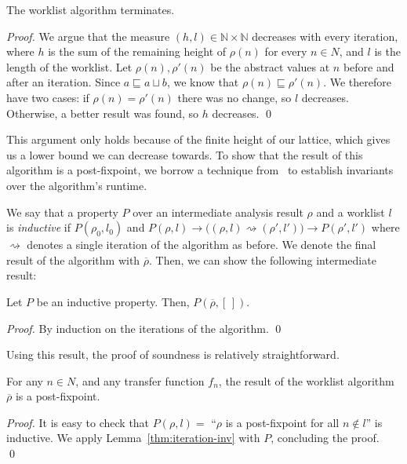 \documentclass[runningheads]{llncs}
\newcommand{\lub}{\sqcup}
\newcommand{\squb}{\sqsubseteq}
\begin{document}
\begin{theorem}
The worklist algorithm terminates.
\end{theorem}

\begin{proof}
We argue that the measure $(h, l) \in \mathbb{N} \times \mathbb{N}$ decreases with every iteration, where $h$ is the sum of the remaining height of $\rho(n)$ for every $n \in N$, and $l$ is the length of the worklist. Let $\rho(n), \rho'(n)$ be the abstract values at $n$ before and after an iteration. Since $a \squb a \lub b$, we know that $\rho(n) \squb \rho'(n)$. We therefore have two cases: if $\rho(n) = \rho'(n)$ there was no change, so $l$ decreases. Otherwise, a better result was found, so $h$ decreases. \qed
\end{proof}

This argument only holds because of the finite height of our lattice, which gives us a lower bound we can decrease towards. To show that the result of this algorithm is a post-fixpoint, we borrow a technique from~\cite{LaSpina25} to establish invariants over the algorithm's runtime.

We say that a property $P$ over an intermediate analysis result $\rho$ and a worklist $l$ is \emph{inductive} if $P(\rho_0, l_0)$ and $P(\rho, l) \to \bigl((\rho, l) \rightsquigarrow (\rho', l')\bigr) \to P(\rho', l')$ where $\rightsquigarrow$ denotes a single iteration of the algorithm as before. We denote the final result of the algorithm with $\overline{\rho}$. Then, we can show the following intermediate result:

\begin{lemma}\label{thm:iteration-inv}
Let $P$ be an inductive property. Then, $P(\overline{\rho}, [\,])$.
\end{lemma}

\begin{proof}
By induction on the iterations of the algorithm. \qed
\end{proof}

Using this result, the proof of soundness is relatively straightforward.

\begin{theorem}\label{thm:soundness}
For any $n \in N$, and any transfer function $f_n$, the result of the worklist algorithm $\overline{\rho}$ is a post-fixpoint.
\end{theorem}

\begin{proof}
It is easy to check that $P(\rho, l) = $ ``$\rho$ is a post-fixpoint for all $n \notin l$'' is inductive. We apply Lemma~\ref{thm:iteration-inv} with $P$, concluding the proof. \qed
\end{proof}
\end{document}
